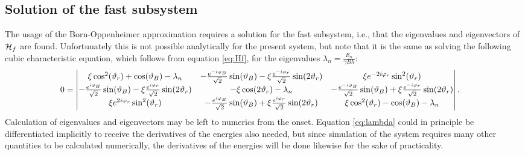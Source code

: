 \documentclass[a4paper]{article}
\begin{document}
\subsection{Solution of the fast subsystem} 
The usage of the Born-Oppenheimer approximation requires a solution for the fast subsystem,
i.e., that the eigenvalues and eigenvectors of \(\mathbb{\cal H}_f\) are found.
Unfortunately this is not possible analytically for the present system, but note that it
is the same as solving the following cubic characteristic equation, which follows
from equation \ref{eq:Hf}, for the
eigenvalues \(\lambda_n = \frac{E_n}{\gamma B\hbar{}}\): %
\begin{align}\label{eq:lambda}
        0 &= \mdet{
                 \xi\cos[2](\vartheta_r) + \cos(\vartheta_B) - \lambda_n& -\frac{
                        e^{-i\varphi_B}}{\sqrt{2}
                }\sin(\vartheta_B) - \xi\frac{e^{-i\varphi_r}}{\sqrt{2} }\sin(2\vartheta_r) &
                \xi e^{-2i\varphi_r}\sin[2](\vartheta_r)\\
                 -\frac{e^{i\varphi_B}}{\sqrt{2}}\sin(\vartheta_B) -
                \xi \frac{e^{i\varphi_r}}{\sqrt{2} }\sin(2\vartheta_r) &
                -\xi\cos(2\vartheta_r) - \lambda_n & -\frac{
                e^{-i\varphi_B}}{\sqrt{2} }\sin(\vartheta_B)+ \xi\frac{e^{-i\varphi_r}}{\sqrt{2}
        }\sin(2\vartheta_r)\\
                \xi e^{2i\varphi_r}\sin[2](\vartheta_r) & -\frac{
                e^{i\varphi_B}}{\sqrt{2} }\sin(\vartheta_B) +
                        \xi \frac{e^{i\varphi_r}}{\sqrt{2} }\sin(2\vartheta_r) &
                        \xi \cos[2](\vartheta_r) - \cos(\vartheta_B) - \lambda_n 
        }
.\end{align}
Calculation of eigenvalues and eigenvectors may be left to numerics from
the onset. Equation \ref{eq:lambda} could in principle be differentiated implicitly to
receive the derivatives of the energies also needed, but since simulation of the system requires many other quantities 
to be calculated numerically, the derivatives of the energies will be done likewise for
the sake of practicality.
\end{document}
